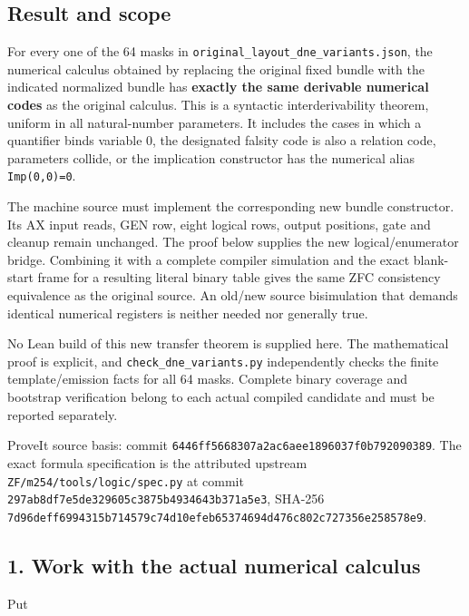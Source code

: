 \hypertarget{result-and-scope}{%
\subsection{Result and scope}\label{result-and-scope}}

For every one of the 64 masks in
\nolinkurl{original_layout_dne_variants.json}, the numerical calculus
obtained by replacing the original fixed bundle with the indicated
normalized bundle has \textbf{exactly the same derivable numerical
codes} as the original calculus. This is a syntactic interderivability
theorem, uniform in all natural-number parameters. It includes the cases
in which a quantifier binds variable 0, the designated falsity code is
also a relation code, parameters collide, or the implication constructor
has the numerical alias \texttt{Imp(0,0)=0}.

The machine source must implement the corresponding new bundle
constructor. Its AX input reads, GEN row, eight logical rows, output
positions, gate and cleanup remain unchanged. The proof below supplies
the new logical/enumerator bridge. Combining it with a complete compiler
simulation and the exact blank-start frame for a resulting literal
binary table gives the same ZFC consistency equivalence as the original
source. An old/new source bisimulation that demands identical numerical
registers is neither needed nor generally true.

No Lean build of this new transfer theorem is supplied here. The
mathematical proof is explicit, and \texttt{check\_dne\_variants.py}
independently checks the finite template/emission facts for all 64
masks. Complete binary coverage and bootstrap verification belong to
each actual compiled candidate and must be reported separately.

ProveIt source basis: commit
\nolinkurl{6446ff5668307a2ac6aee1896037f0b792090389}. The exact formula
specification is the attributed upstream
\nolinkurl{ZF/m254/tools/logic/spec.py} at commit
\nolinkurl{297ab8df7e5de329605c3875b4934643b371a5e3}, SHA-256
\nolinkurl{7d96deff6994315b714579c74d10efeb65374694d476c802c727356e258578e9}.

\hypertarget{work-with-the-actual-numerical-calculus}{%
\subsection{1. Work with the actual numerical
calculus}\label{work-with-the-actual-numerical-calculus}}

Put

